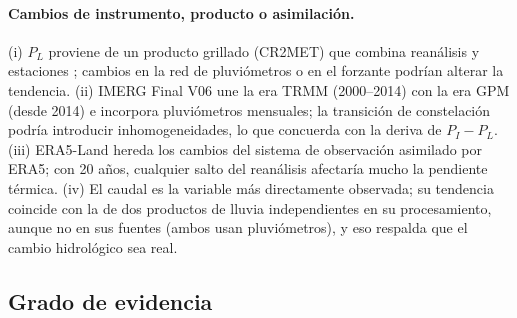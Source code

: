 \documentclass[11pt,letterpaper]{article}
\begin{document}
\paragraph{Cambios de instrumento, producto o asimilación.} (i) $P_L$ proviene de un producto
grillado (CR2MET) que combina reanálisis y estaciones \citep{AlvarezGarreton2018}; cambios en la red de
pluviómetros o en el forzante podrían alterar la tendencia. (ii) IMERG Final V06 une la era TRMM
(2000--2014) con la era GPM (desde 2014) e incorpora pluviómetros mensuales; la transición de constelación
podría introducir inhomogeneidades, lo que concuerda con la deriva de $P_I-P_L$. (iii) ERA5-Land
\citep{MunozSabater2021} hereda los cambios del sistema de observación asimilado por ERA5; con 20 años,
cualquier salto del reanálisis afectaría mucho la pendiente térmica. (iv) El caudal es la variable más
directamente observada; su tendencia coincide con la de dos productos de lluvia independientes en su
procesamiento, aunque no en sus fuentes (ambos usan pluviómetros), y eso respalda que el cambio hidrológico
sea real.

\subsection{Grado de evidencia}
\end{document}
